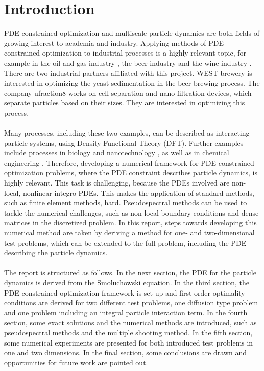 \documentclass[11pt, a4paper]{article}
\theoremstyle{definition}
\begin{document}
\section{Introduction}
PDE-constrained optimization and multiscale particle dynamics are both fields of growing interest to academia and industry. Applying methods of PDE-constrained optimization to industrial processes is a highly relevant topic, for example in the oil and gas industry \cite{Brandman2018}, the beer industry \cite{RamirezW.F.2007Obf} and the wine industry \cite{MergerJuri2017Ocoa}. 
There are two industrial partners affiliated with this project. WEST brewery is interested in optimizing the yeast sedimentation in the beer brewing process. The company ufraction8 works on cell separation and nano filtration devices, which separate particles based on their sizes. They are interested in optimizing this process.
\\
\\
Many processes, including these two examples, can be described as interacting particle systems, using Density Functional Theory (DFT). Further examples include processes in biology and nanotechnology \cite{FrinkDFT}, as well as in chemical engineering \cite{WuJianzhong2006Dftf}.
Therefore, developing a numerical framework for PDE-constrained optimization problems, where the PDE constraint describes particle dynamics, is highly relevant. This task is challenging, because the PDEs involved are non-local, nonlinear integro-PDEs. This makes the application of standard methods, such as finite element methods, hard. Pseudospectral methods can be used to tackle the numerical challenges, such as non-local boundary conditions and dense matrices in the discretized problem.
In this report, steps towards developing this numerical method are taken by deriving a method for one- and two-dimensional test problems, which can be extended to the full problem, including the PDE describing the particle dynamics.
\\
\\
The report is structured as follows. In the next section, the PDE for the particle dynamics is derived from the Smoluchowski equation. In the third section, the PDE-constrained optimization framework is set up and first-order optimality conditions are derived for two different test problems, one diffusion type problem and one problem including an integral particle interaction term.
In the fourth section, some exact solutions and the numerical methods are introduced, such as pseudospectral methods and the multiple shooting method.
In the fifth section, some numerical experiments are presented for both introduced test problems in one and two dimensions.
In the final section, some conclusions are drawn and opportunities for future work are pointed out.
\end{document}
